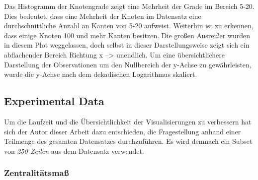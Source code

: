 \documentclass[
  12 pt,
]{article}
\newenvironment{Shaded}{\begin{snugshade}}{\end{snugshade}}
\newcommand{\CommentTok}[1]{\textcolor[rgb]{0.56,0.35,0.01}{\textit{#1}}}
\newcommand{\DataTypeTok}[1]{\textcolor[rgb]{0.13,0.29,0.53}{#1}}
\newcommand{\DecValTok}[1]{\textcolor[rgb]{0.00,0.00,0.81}{#1}}
\newcommand{\KeywordTok}[1]{\textcolor[rgb]{0.13,0.29,0.53}{\textbf{#1}}}
\newcommand{\NormalTok}[1]{#1}
\newcommand{\OperatorTok}[1]{\textcolor[rgb]{0.81,0.36,0.00}{\textbf{#1}}}
\newcommand{\StringTok}[1]{\textcolor[rgb]{0.31,0.60,0.02}{#1}}
\begin{document}
Das Histogramm der Knotengrade zeigt eine Mehrheit der Grade im Bereich
5-20. Dies bedeutet, dass eine Mehrheit der Knoten im Datensatz eine
durchschnittliche Anzahl an Kanten von 5-20 aufweist. Weiterhin ist zu
erkennen, dass einige Knoten 100 und mehr Kanten besitzen. Die großen
Ausreißer wurden in diesem Plot weggelassen, doch selbst in dieser
Darstellungsweise zeigt sich ein abflachender Bereich Richtung x
--\textgreater{} unendlich. Um eine übersichtlichere Darstellung der
Observationen um den Nullbereich der y-Achse zu gewährleisten, wurde die
y-Achse nach dem dekadischen Logarithmus skaliert.

\hypertarget{experimental-data}{%
\subsection{Experimental Data}\label{experimental-data}}

Um die Laufzeit und die Übersichtlichkeit der Visualisierungen zu
verbessern hat sich der Autor dieser Arbeit dazu entschieden, die
Fragestellung anhand einer Teilmenge des gesamten Datensatzes
durchzuführen. Es wird demnach ein Subset von \emph{250 Zeilen} aus dem
Datensatz verwendet.

\begin{Shaded}
\end{Shaded}

\hypertarget{zentralituxe4tsmauxdf}{%
\subsubsection{Zentralitätsmaß}\label{zentralituxe4tsmauxdf}}
\end{document}
